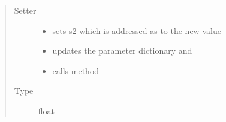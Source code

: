 \documentclass[a4paper,10pt,english]{sphinxmanual}
\begin{document}
\begin{fulllineitems}
\begin{fulllineitems}
\begin{quote}
\begin{description}
\item[{Setter}] \leavevmode\begin{itemize}
\item {} 
sets s2 which is addressed as  to the new value

\item {} 
updates the parameter dictionary  and

\item {} 
calls method 

\end{itemize}

\item[{Type}] \leavevmode
float

\end{description}\end{quote}

\end{fulllineitems}


\end{fulllineitems}

\end{document}
